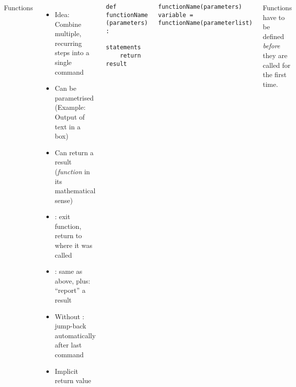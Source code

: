 \begin{frame}[fragile]
%
\begin{columns}[T]
\begin{Large}
{Functions}
\vspace{6pt}
\end{Large}
\begin{itemize}
\item Idea: Combine multiple, recurring steps into a single command
\item Can be parametrised (Example: Output of text in a box)
\item Can return a result (\Thus \emph{function} in its mathematical sense)
\item {}: exit function, return to where it was called
\item {}: same as above, plus: \enquote{report} a result
\item Without : jump-back automatically after last command
\item Implicit return value 
\end{itemize}
%
\begin{codebox}
\begin{verbatim}
def functionName (parameters) :
    statements
    return result
\end{verbatim}
\end{codebox}
%
\begin{codebox}
\begin{verbatim}
functionName(parameters)
variable = functionName(parameterlist)
\end{verbatim}
\end{codebox}
%
\begin{hintbox}
Functions have to be defined \emph{before} they are called for the first time.
\end{hintbox}
\end{columns}
%
\end{frame}


